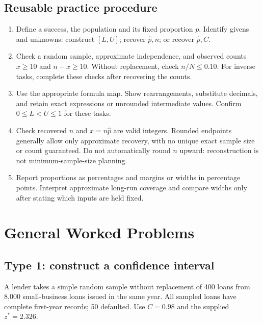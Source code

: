 \subsection{Reusable practice procedure}
\begin{enumerate}
\item Define a success, the population and its fixed proportion $p$. Identify givens and unknowns: construct $[L,U]$; recover $\hat p,n$; or recover $\hat p,C$.
\item Check a random sample, approximate independence, and observed counts $x\ge10$ and $n-x\ge10$. Without replacement, check $n/N\le0.10$. For inverse tasks, complete these checks after recovering the counts.
\item Use the appropriate formula map. Show rearrangements, substitute decimals, and retain exact expressions or unrounded intermediate values. Confirm $0\le L<U\le1$ for these tasks.
\item Check recovered $n$ and $x=n\hat p$ are valid integers. Rounded endpoints generally allow only approximate recovery, with no unique exact sample size or count guaranteed. Do not automatically round $n$ upward: reconstruction is not minimum-sample-size planning.
\item Report proportions as percentages and margins or widths in percentage points. Interpret approximate long-run coverage and compare widths only after stating which inputs are held fixed.
\end{enumerate}
\clearpage

\section{General Worked Problems}\label{sec:worked-solution-examples}

\subsection{Type 1: construct a confidence interval}\label{prob:c5-1}
A lender takes a simple random sample without replacement of 400 loans from 8,000 small-business loans issued in the same year. All sampled loans have complete first-year records; 50 defaulted. Use $C=0.98$ and the supplied $z^*=2.326$.
